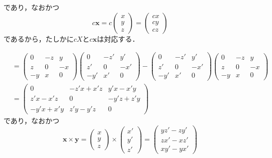 \begin{tproof}
\begin{description}
\[          \]
          であり，なおかつ
          \[
            c\bm{x} = c\begin{pmatrix} x \\ y \\ z \end{pmatrix} = \begin{pmatrix} cx \\ cy \\ cz \end{pmatrix}
          \]
          であるから，たしかに$cX$と$c\bm{x}$は対応する．
    \item [【\text{$[X,Y]$と$\bm{x} \times \bm{y}$について】}]
          \begin{align*}
            [X,Y] & =\begin{pmatrix} 0 & -z & y \\ z & 0 & -x \\ -y & x & 0 \end{pmatrix}\begin{pmatrix} 0 & -z ' & y ' \\ z' & 0 & -x' \\ -y' & x ' & 0 \end{pmatrix}-\begin{pmatrix} 0 & -z ' & y ' \\ z' & 0 & -x' \\ -y' & x ' & 0 \end{pmatrix} \begin{pmatrix} 0 & -z & y \\ z & 0 & -x \\ -y & x & 0 \end{pmatrix} \\
                  & = \begin{pmatrix} 0 & -z'x+x'z & y'x-x'y \\ z'x-x'z & 0 & -y'z+z'y \\ -y'x+x'y & z'y-y'z & 0 \end{pmatrix}
          \end{align*}
          であり，なおかつ
          \[
            \bm{x}\times \bm{y} = \begin{pmatrix} x \\ y \\ z \end{pmatrix} \times \begin{pmatrix} x' \\ y ' \\ z' \end{pmatrix} = \begin{pmatrix} yz'-zy' \\ zx'-xz' \\ xy'-yx' \end{pmatrix}
\]
\end{description}
\end{tproof}
